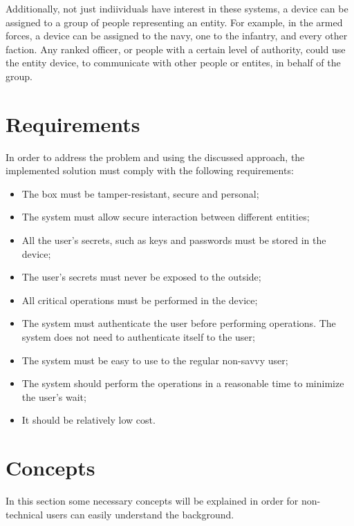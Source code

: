Additionally, not just indiividuals have interest in these systems, a device can be assigned to a group of people representing an entity. For example, in the armed forces, a device can be assigned to the navy, one to the infantry, and every other faction. Any ranked officer, or people with a certain level of authority, could use the entity device, to communicate with other people or entites, in behalf of the group.

\section{Requirements} \label{chap:problem:requirements}

In order to address the problem and using the discussed approach, the implemented solution must comply with the following requirements:
\begin{itemize}
	\item The box must be tamper-resistant, secure and personal;
	\item The system must allow secure interaction between different entities;
	\item All the user's secrets, such as keys and passwords must be stored in the device;
	\item The user's secrets must never be exposed to the outside;
	\item All critical operations must be performed in the device;
	\item The system must authenticate the user before performing operations. The system does not need to authenticate itself to the user;
	\item The system must be easy to use to the regular non-savvy user;
	\item The system should perform the operations in a reasonable time to minimize the user's wait;
	\item It should be relatively low cost.
\end{itemize}

\section{Concepts} \label{chap:problem:concepts}

In this section some necessary concepts will be explained in order for non-technical users can easily understand the background.

